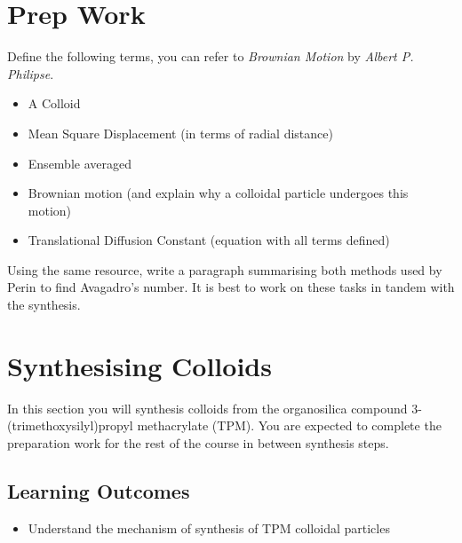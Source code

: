 \documentclass[12pt,a4paper,twoside]{article}
\begin{document}
\newpage

\section{Prep Work}

Define the following terms, you can refer to \emph{Brownian Motion} by \emph{Albert P. Philipse}.

\begin{itemize}
    \item A Colloid
    \item Mean Square Displacement (in terms of radial distance)
    \item Ensemble averaged
    \item Brownian motion (and explain why a colloidal particle undergoes this motion)
    \item Translational Diffusion Constant (equation with all terms defined)
    
\end{itemize}

Using the same resource, write a paragraph summarising both methods used by Perin to find Avagadro’s number. It is best to work on these tasks in tandem with the synthesis.

\newpage

\section{Synthesising Colloids}
In this section you will synthesis colloids from the organosilica compound 3-(trimethoxysilyl)propyl methacrylate (TPM). You are expected to complete the preparation work for the rest of the course in between synthesis steps.

\subsection{Learning Outcomes}

\begin{itemize}
    \item Understand the mechanism of synthesis of TPM colloidal particles
\end{itemize}
\end{document}
